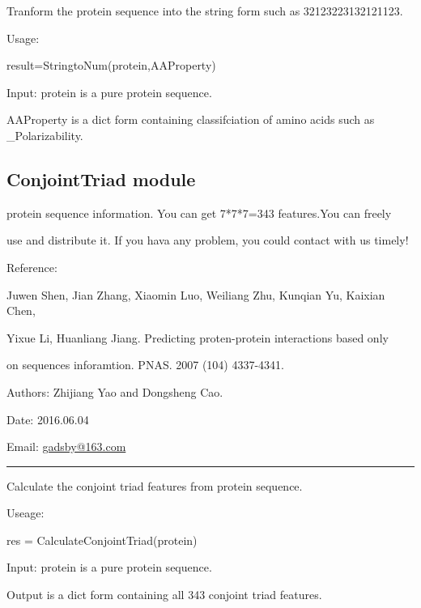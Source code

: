 \documentclass[letterpaper,10pt,english]{sphinxmanual}
\begin{document}
\begin{fulllineitems}
\label{reference/CTD:CTD.StringtoNum}
Tranform the protein sequence into the string form such as 32123223132121123.

Usage:

result=StringtoNum(protein,AAProperty)

Input: protein is a pure protein sequence.

AAProperty is a dict form containing classifciation of amino acids such as \_Polarizability.

\end{fulllineitems}



\subsection{ConjointTriad module}
\label{reference/ConjointTriad:conjointtriad-module}\label{reference/ConjointTriad:module-ConjointTriad}\label{reference/ConjointTriad::doc}
protein sequence information. You can get 7*7*7=343 features.You can freely

use and distribute it. If you hava any problem, you could contact with us timely!

Reference:

Juwen Shen, Jian Zhang, Xiaomin Luo, Weiliang Zhu, Kunqian Yu, Kaixian Chen,

Yixue Li, Huanliang Jiang. Predicting proten-protein interactions based only

on sequences inforamtion. PNAS. 2007 (104) 4337-4341.

Authors: Zhijiang Yao and Dongsheng Cao.

Date: 2016.06.04

Email: \href{mailto:gadsby@163.com}{gadsby@163.com}


\bigskip\hrule{}\bigskip


\begin{fulllineitems}
\label{reference/ConjointTriad:ConjointTriad.CalculateConjointTriad}
Calculate the conjoint triad features from protein sequence.

Useage:

res = CalculateConjointTriad(protein)

Input: protein is a pure protein sequence.

Output is a dict form containing all 343 conjoint triad features.

\end{fulllineitems}
\end{document}
